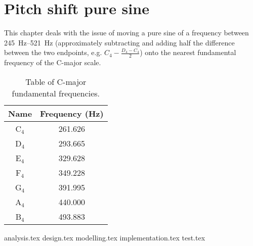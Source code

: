 
\chapter{Pitch shift pure sine}
\label{sec:puresine}

This chapter deals with the issue of moving a pure sine of a frequency between \SIrange{245}{521}{\hertz} (approximately subtracting and adding half the difference between the two endpoints, e.g. $C_4 -\frac{D_4 - C_4}{2}$) onto the nearest fundamental frequency of the C-major scale\cite{wiki:pianokeys}.

\begin{table}[H]
	\centering
	\begin{tabular}{c c}
		\toprule
		Name & Frequency (\si{\hertz}) \\
		\midrule
		C$_4$ & \num{261.626} \\
		D$_4$ & \num{293.665} \\
		E$_4$ & \num{329.628} \\
		F$_4$ & \num{349.228} \\
		G$_4$ & \num{391.995} \\
		A$_4$ & \num{440.000} \\
		B$_4$ & \num{493.883} \\
		\bottomrule
	\end{tabular}
	\caption{Table of C-major fundamental frequencies.}
	\label{tab:cmajor}
\end{table}

{analysis.tex}
{design.tex}
{modelling.tex}
{implementation.tex}
{test.tex}